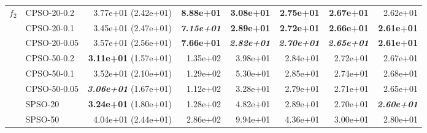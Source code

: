 \documentclass[a4paper,twoside]{article}
\begin{document}
\begin{table}
\begin{tabular}{|| l | l | r | r | r | r | r | r ||}
$f_2$   &  CPSO-20-0.2    &  3.77e+01 (2.42e+01)               &  {\bf 8.88e+01}         &  {\bf 3.08e+01}         &  {\bf 2.75e+01}         &  {\bf 2.67e+01}         &  2.62e+01  \\
    \cline{2-8} 
        &  CPSO-20-0.1    &  3.45e+01 (2.47e+01)               &  {\bf \emph{7.15e+01}}  &  {\bf 2.89e+01}         &  {\bf 2.72e+01}         &  {\bf 2.66e+01}         &  {\bf 2.61e+01}  \\
    \cline{2-8}
        &  CPSO-20-0.05   &  3.57e+01 (2.56e+01)               &  {\bf 7.66e+01}         &  {\bf \emph{2.82e+01}}  &  {\bf \emph{2.70e+01}}  &  {\bf \emph{2.65e+01}}  &  {\bf 2.61e+01} \\
    \cline{2-8}
        &  CPSO-50-0.2    &  {\bf 3.11e+01} (1.57e+01)         &  1.35e+02               &  3.98e+01               &  2.84e+01               &  2.72e+01               &  2.67e+01 \\
    \cline{2-8}
        &  CPSO-50-0.1    &  3.52e+01 (2.10e+01)               &  1.29e+02               &  5.30e+01               &  2.85e+01               &  2.74e+01               &  2.68e+01 \\
    \cline{2-8}
        &  CPSO-50-0.05   &  {\bf \emph{3.06e+01}} (1.67e+01)  &  1.12e+02               &  3.28e+01               &  2.79e+01               &  2.71e+01               &  2.65e+01 \\
\hline \hline
        &  SPSO-20        &  {\bf 3.24e+01} (1.80e+01)         &  1.28e+02               &  4.82e+01               &  2.89e+01               &  2.70e+01               &  {\bf \emph{2.60e+01}} \\
    \cline{2-8} 
        &  SPSO-50        &  4.04e+01 (2.44e+01)               &  2.86e+02               &  9.94e+01               &  4.36e+01               &  3.00e+01               &  2.80e+01 \\

\hline \hline \hline


\end{tabular}
\end{table}
\end{document}
